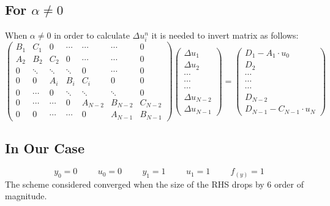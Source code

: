 \documentclass[11pt, a4paper]{article}
\begin{document}
\subsection{For $\alpha \neq 0$}
When $\alpha \neq 0$ in order to calculate $\Delta u^n_i$ it is needed to invert matrix as follows:
\begin{equation}
    \begin{pmatrix}
        B_1 & C_1 & 0 & \cdots & \cdots & \cdots & 0 \\
        A_2 & B_2 & C_2 & 0 & \cdots & \cdots & 0 \\
        0 & \ddots & \ddots & \ddots & 0 & \cdots & 0 \\
        0 & 0 & A_i & B_i & C_i & 0 & 0 \\
        0 & \cdots & 0 & \ddots & \ddots & \ddots & 0 \\
        0 & \cdots & \cdots & 0 & A_{N-2} & B_{N-2} & C_{N-2} \\
        0 & 0 & \cdots & \cdots & 0 & A_{N-1} &B_{N-1}
    \end{pmatrix}
    \begin{pmatrix}
        \Delta u_1\\
        \Delta u_2\\
        \cdots\\
        \cdots\\
        \cdots\\
        \Delta u_{N-2}\\
        \Delta u_{N-1}
    \end{pmatrix}
    =
    \begin{pmatrix}
        D_1-A_1\cdot u_0\\
        D_2\\
        \cdots\\
        \cdots\\
        \cdots\\
        D_{N-2}\\
        D_{N-1}-C_{N-1}\cdot u_N
    \end{pmatrix}
\end{equation}
\subsection{In Our Case}
\begin{equation}
    y_0 = 0 \hspace{1cm}
    u_0 = 0 \hspace{1cm}
    y_1 = 1 \hspace{1cm}
    u_1 = 1 \hspace{1cm}
    f_{(y)} = 1
\end{equation}
The scheme considered converged when the size of the RHS drops by 6 order of magnitude.
\newpage
\end{document}
